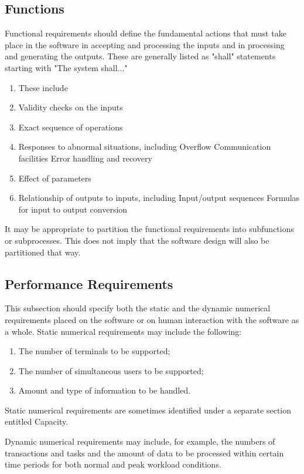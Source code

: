 \documentclass[draftclsnofoot,onecolumn,10pt]{IEEEtran}
\begin{document}
\subsection{Functions}
Functional requirements should define the fundamental actions that must take
place in the software in accepting and processing the inputs and in processing
and generating the outputs. These are generally listed as "shall" statements
starting with "The system shall..."

\begin{enumerate}
	\item These include
	\item Validity checks on the inputs
	\item Exact sequence of operations
	\item Responses to abnormal situations, including
		\subitem Overflow
		\subitem Communication facilities
		\subitem Error handling and recovery
	\item Effect of parameters
	\item Relationship of outputs to inputs, including
		\subitem Input/output sequences
		\subitem Formulas for input to output conversion
\end{enumerate}


It may be appropriate to partition the functional requirements into subfunctions
or subprocesses. This does not imply that the software design will also be
partitioned that way.

\subsection{Performance Requirements}
This subsection should specify both the static and the dynamic numerical
requirements placed on the software or on human interaction with the software as
a whole. Static numerical requirements may include the following:

\begin{enumerate}
	\item The number of terminals to be supported;
	\item The number of simultaneous users to be supported;
	\item Amount and type of information to be handled.
\end{enumerate}

Static numerical requirements are sometimes identified under a separate section
entitled Capacity.

Dynamic numerical requirements may include, for example, the numbers of
transactions and tasks and the amount of data to be processed within certain
time periods for both normal and peak workload conditions.
\end{document}
